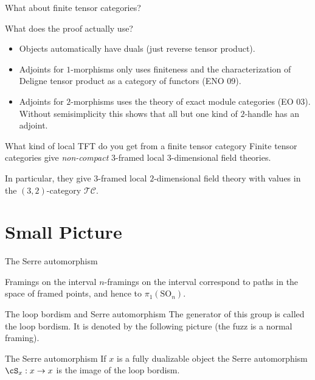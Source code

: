 \documentclass[beamer]{beamer}
\newlength{\arrowlength}
\begin{document}
\begin{frame}{What about finite tensor categories?}
\begin{block}{What does the proof actually use?}
\begin{itemize}
\item Objects automatically have duals (just reverse tensor product).
\item Adjoints for $1$-morphisms only uses finiteness and the characterization of Deligne tensor product as a category of functors (ENO 09).
\item Adjoints for $2$-morphisms uses the theory of exact module categories (EO 03).  Without semisimplicity this shows that all but one kind of $2$-handle has an adjoint.
\end{itemize}
\end{block}

\begin{block}{What kind of local TFT do you get from a finite tensor category}
Finite tensor categories give \emph{non-compact} $3$-framed local $3$-dimensional field theories.

In particular, they give $3$-framed local $2$-dimensional field theory with values in the $(3,2)$-category $\mathcal{TC}$.
\end{block}
\end{frame}

\section{Small Picture}

\begin{frame}{The Serre automorphism}
\begin{block}{Framings on the interval}
$n$-framings on the interval correspond to paths in the space of framed points, and hence to $\pi_1(\mathrm{SO}_n)$.
\end{block}

\begin{block}{The loop bordism and Serre automorphism}
The generator of this group is called the loop bordism.  It is denoted by the following picture (the fuzz is a normal framing).

\begin{center}
\end{center}

\end{block}

\begin{block}{The Serre automorphism}
If $x$ is a fully dualizable object the Serre automorphism $\cS_x: x \rightarrow x$ is the image of the loop bordism.
\end{block}
\end{frame}
\end{document}
